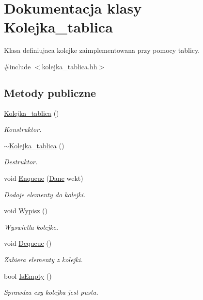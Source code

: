 \hypertarget{class_kolejka__tablica}{\section{\-Dokumentacja klasy \-Kolejka\-\_\-tablica}
\label{class_kolejka__tablica}
}


\-Klasa definiujaca kolejke zaimplementowana przy pomocy tablicy.  




{\ttfamily \#include $<$kolejka\-\_\-tablica.\-hh$>$}

\subsection*{\-Metody publiczne}
\begin{DoxyCompactItemize}
\item 
\hyperlink{class_kolejka__tablica_a894412f068b803a5caed20eb0888ace9}{\-Kolejka\-\_\-tablica} ()
\begin{DoxyCompactList}\small\item\em \-Konstruktor. \end{DoxyCompactList}\item 
\hyperlink{class_kolejka__tablica_aed741c6c09b16e8989be95ea5fdd3265}{$\sim$\-Kolejka\-\_\-tablica} ()
\begin{DoxyCompactList}\small\item\em \-Destruktor. \end{DoxyCompactList}\item 
void \hyperlink{class_kolejka__tablica_a061e78102348432ef0036430c9962bc3}{\-Enqueue} (\hyperlink{class_dane}{\-Dane} wekt)
\begin{DoxyCompactList}\small\item\em \-Dodaje elementy do kolejki. \end{DoxyCompactList}\item 
void \hyperlink{class_kolejka__tablica_a15695ac2eb79a4a5cc582da24611b3d7}{\-Wypisz} ()
\begin{DoxyCompactList}\small\item\em \-Wyswietla kolejke. \end{DoxyCompactList}\item 
void \hyperlink{class_kolejka__tablica_aeaaac32dfd39b8e939b71842a87bff4b}{\-Dequeue} ()
\begin{DoxyCompactList}\small\item\em \-Zabiera elementy z kolejki. \end{DoxyCompactList}\item 
bool \hyperlink{class_kolejka__tablica_a60b76bc952560e33eae90b4baf014410}{\-Is\-Empty} ()
\begin{DoxyCompactList}\small\item\em \-Sprawdza czy kolejka jest pusta. \end{DoxyCompactList}\end{DoxyCompactItemize}


